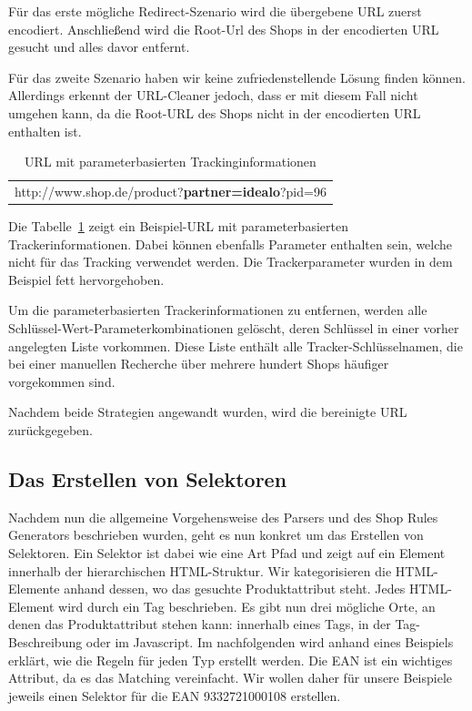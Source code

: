 Für das erste mögliche Redirect-Szenario wird die übergebene URL zuerst encodiert.
Anschließend wird die Root-Url des Shops in der encodierten URL gesucht und alles davor entfernt.

Für das zweite Szenario haben wir keine zufriedenstellende Lösung finden können.
Allerdings erkennt der URL-Cleaner jedoch, dass er mit diesem Fall nicht umgehen kann, da die Root-URL des Shops
nicht in der encodierten URL enthalten ist.

\begin{table}[h]
    \centering
    \begin{tabular}{ c }
        http://www.shop.de/product?\textbf{partner=idealo}?pid=96
    \end{tabular}
    \caption{URL mit parameterbasierten Trackinginformationen}
    \label{tab:trackparameter}
\end{table}

Die Tabelle~\ref{tab:trackparameter} zeigt ein Beispiel-URL mit parameterbasierten Trackerinformationen.
Dabei können ebenfalls Parameter enthalten sein, welche nicht für das Tracking verwendet werden.
Die Trackerparameter wurden in dem Beispiel fett hervorgehoben.

Um die parameterbasierten Trackerinformationen zu entfernen, werden alle Schlüssel-Wert-Parameterkombinationen
gelöscht, deren Schlüssel in einer vorher angelegten Liste vorkommen.
Diese Liste enthält alle Tracker-Schlüsselnamen, die bei einer manuellen Recherche über mehrere hundert Shops
häufiger vorgekommen sind.

Nachdem beide Strategien angewandt wurden, wird die bereinigte URL zurückgegeben.

\subsection{Das Erstellen von Selektoren}
\label{subsec:erstellen-von-selektoren}

Nachdem nun die allgemeine Vorgehensweise des Parsers und des Shop Rules Generators beschrieben wurden, geht es nun
konkret um das Erstellen von Selektoren.
Ein Selektor ist dabei wie eine Art Pfad und zeigt auf ein Element innerhalb der hierarchischen HTML-Struktur.
Wir kategorisieren die HTML-Elemente anhand dessen, wo das gesuchte Produktattribut steht.
Jedes HTML-Element wird durch ein Tag beschrieben.
Es gibt nun drei mögliche Orte, an denen das Produktattribut stehen kann: innerhalb eines Tags, in der Tag-Beschreibung
oder im Javascript.
Im nachfolgenden wird anhand eines Beispiels erklärt, wie die Regeln für jeden Typ erstellt werden.
Die EAN ist ein wichtiges Attribut, da es das Matching vereinfacht.
Wir wollen daher für unsere Beispiele jeweils einen Selektor für die EAN 9332721000108 erstellen.

